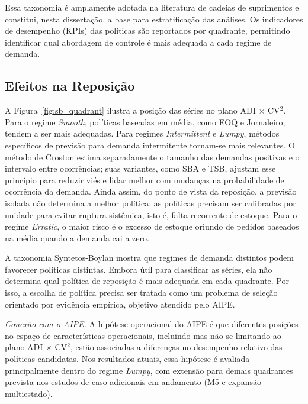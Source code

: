 Essa taxonomia é amplamente adotada na literatura de cadeias de suprimentos \citep{Boylan2008Intermittent,Syntetos2012DemandClassificationsApplications} e constitui, nesta dissertação, a base para estratificação das análises. Os indicadores de desempenho (KPIs) das políticas são reportados por quadrante, permitindo identificar qual abordagem de controle é mais adequada a cada regime de demanda.

\subsection{Efeitos na Reposição}

A Figura~\ref{fig:sb_quadrant} ilustra a posição das séries no plano ADI $\times$ CV$^2$. Para o regime \textit{Smooth}, políticas baseadas em média, como EOQ e Jornaleiro, tendem a ser mais adequadas. Para regimes \textit{Intermittent} e \textit{Lumpy}, métodos específicos de previsão para demanda intermitente tornam-se mais relevantes. O método de Croston estima separadamente o tamanho das demandas positivas e o intervalo entre ocorrências; suas variantes, como SBA e TSB, ajustam esse princípio para reduzir viés e lidar melhor com mudanças na probabilidade de ocorrência da demanda. Ainda assim, do ponto de vista da reposição, a previsão isolada não determina a melhor política: as políticas precisam ser calibradas por unidade para evitar ruptura sistêmica, isto é, falta recorrente de estoque. Para o regime \textit{Erratic}, o maior risco é o excesso de estoque oriundo de pedidos baseados na média quando a demanda cai a zero.

\smallskip
A taxonomia Syntetos-Boylan mostra que regimes de demanda distintos podem favorecer políticas distintas. Embora útil para classificar as séries, ela não determina qual política de reposição é mais adequada em cada quadrante. Por isso, a escolha de política precisa ser tratada como um problema de seleção orientado por evidência empírica, objetivo atendido pelo AIPE.

\medskip
\noindent\textit{Conexão com o AIPE.} A hipótese operacional do AIPE é que diferentes posições no espaço de características operacionais, incluindo mas não se limitando ao plano ADI $\times$ CV$^2$, estão associadas a diferenças no desempenho relativo das políticas candidatas. Nos resultados atuais, essa hipótese é avaliada principalmente dentro do regime \textit{Lumpy}, com extensão para demais quadrantes prevista nos estudos de caso adicionais em andamento (M5 e expansão multiestado).

